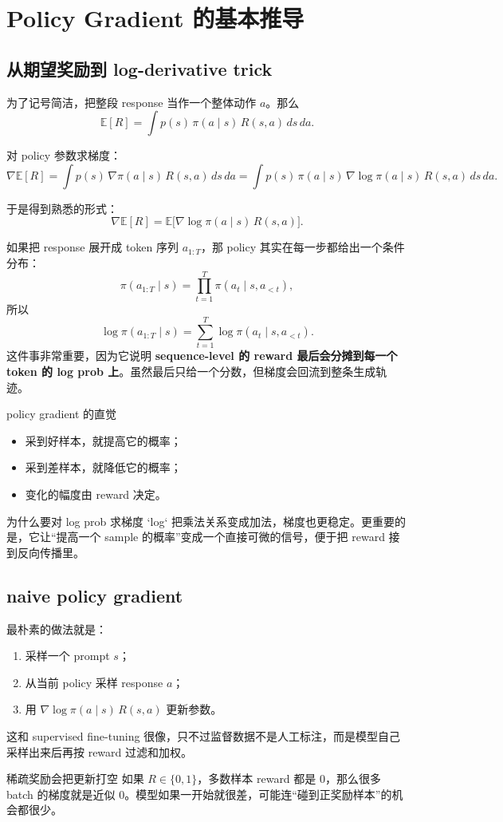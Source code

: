 \section{Policy Gradient 的基本推导}

\subsection{从期望奖励到 log-derivative trick}

为了记号简洁，把整段 response 当作一个整体动作 $a$。那么
\[
\mathbb{E}[R] = \int p(s)\,\pi(a \mid s)\,R(s,a)\,ds\,da.
\]

对 policy 参数求梯度：
\[
\nabla \mathbb{E}[R]
= \int p(s)\,\nabla \pi(a \mid s)\,R(s,a)\,ds\,da
= \int p(s)\,\pi(a \mid s)\,\nabla \log \pi(a \mid s)\,R(s,a)\,ds\,da.
\]

于是得到熟悉的形式：
\[
\nabla \mathbb{E}[R] = \mathbb{E}\big[\nabla \log \pi(a \mid s)\,R(s,a)\big].
\]

如果把 response 展开成 token 序列 $a_{1:T}$，那 policy 其实在每一步都给出一个条件分布：
\[
\pi(a_{1:T}\mid s)=\prod_{t=1}^T \pi(a_t \mid s, a_{<t}),
\]
所以
\[
\log \pi(a_{1:T}\mid s)=\sum_{t=1}^T \log \pi(a_t \mid s, a_{<t}).
\]
这件事非常重要，因为它说明 \textbf{sequence-level 的 reward 最后会分摊到每一个 token 的 log prob 上}。虽然最后只给一个分数，但梯度会回流到整条生成轨迹。

\begin{importantbox}{policy gradient 的直觉}
\begin{itemize}
    \item 采到好样本，就提高它的概率；
    \item 采到差样本，就降低它的概率；
    \item 变化的幅度由 reward 决定。
\end{itemize}
\end{importantbox}


\begin{knowledgebox}{为什么要对 log prob 求梯度}
`log` 把乘法关系变成加法，梯度也更稳定。更重要的是，它让“提高一个 sample 的概率”变成一个直接可微的信号，便于把 reward 接到反向传播里。
\end{knowledgebox}


\subsection{naive policy gradient}

最朴素的做法就是：
\begin{enumerate}
    \item 采样一个 prompt $s$；
    \item 从当前 policy 采样 response $a$；
    \item 用 $\nabla \log \pi(a \mid s)\,R(s,a)$ 更新参数。
\end{enumerate}

这和 supervised fine-tuning 很像，只不过监督数据不是人工标注，而是模型自己采样出来后再按 reward 过滤和加权。

\begin{warningbox}{稀疏奖励会把更新打空}
如果 $R \in \{0,1\}$，多数样本 reward 都是 0，那么很多 batch 的梯度就是近似 0。模型如果一开始就很差，可能连“碰到正奖励样本”的机会都很少。
\end{warningbox}


